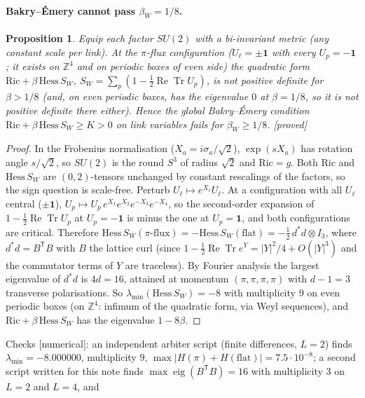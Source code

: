 \documentclass[11pt,a4paper]{article}
\newtheorem{proposition}[theorem]{Proposition}
\theoremstyle{remark}
\theoremstyle{definition}
\newcommand{\Z}{\mathbb{Z}}
\newcommand{\ReTr}{\operatorname{Re}\operatorname{Tr}}
\newcommand{\st}[1]{\textsf{[#1]}}
\begin{document}
\paragraph{Bakry--\'Emery cannot pass $\beta_W=1/8$.}
\begin{proposition}\label{prop:piflux}
Equip each factor $SU(2)$ with a bi-invariant metric (any constant scale per link). At the $\pi$-flux
configuration ($U_\ell=\pm\mathbf 1$ with every $U_p=-\mathbf 1$; it exists on $\Z^4$ and on periodic boxes of
even side) the quadratic form $\mathrm{Ric}+\beta\,\mathrm{Hess}\,S_W$, $S_W=\sum_p(1-\frac12\ReTr U_p)$, is not
positive definite for $\beta>1/8$ (and, on even periodic boxes, has the eigenvalue $0$ at $\beta=1/8$, so it
is not positive definite there either). Hence the global Bakry--\'Emery
condition $\mathrm{Ric}+\beta\,\mathrm{Hess}\,S_W\ge K>0$ on link variables fails for $\beta_W\ge1/8$. \st{proved}
\end{proposition}
\begin{proof}
In the Frobenius normalisation ($X_a=i\sigma_a/\sqrt2$), $\exp(sX_a)$ has rotation angle $s/\sqrt2$, so
$SU(2)$ is the round $S^3$ of radius $\sqrt2$ and $\mathrm{Ric}=g$. Both $\mathrm{Ric}$ and $\mathrm{Hess}\,S_W$ are
$(0,2)$-tensors unchanged by constant rescalings of the factors, so the sign question is scale-free.
Perturb $U_\ell\mapsto e^{X_\ell}U_\ell$. At a configuration with all $U_\ell$ central ($\pm\mathbf 1$),
$U_p\mapsto U_p\,e^{X_1}e^{X_2}e^{-X_3}e^{-X_4}$, so the second-order expansion of $1-\frac12\ReTr U_p$ at
$U_p=-\mathbf 1$ is minus the one at $U_p=\mathbf 1$, and both configurations are critical. Therefore
$\mathrm{Hess}\,S_W(\pi\text{-flux})=-\mathrm{Hess}\,S_W(\text{flat})=-\frac12\,d^*d\otimes I_3$, where $d^*d=B^{\mathsf T}B$
with $B$ the lattice curl (since $1-\frac12\ReTr e^{Y}=|Y|^2/4+O(|Y|^3)$ and the commutator terms of $Y$ are
traceless). By Fourier analysis the largest eigenvalue of $d^*d$ is $4d=16$, attained at momentum
$(\pi,\pi,\pi,\pi)$ with $d-1=3$ transverse polarisations. So $\lambda_{\min}(\mathrm{Hess}\,S_W)=-8$ with
multiplicity $9$ on even periodic boxes (on $\Z^4$: infimum of the quadratic form, via Weyl sequences), and
$\mathrm{Ric}+\beta\,\mathrm{Hess}\,S_W$ has the eigenvalue $1-8\beta$.
\end{proof}
Checks \st{numerical}: an independent arbiter script (finite differences, $L=2$) finds
$\lambda_{\min}=-8.000000$, multiplicity $9$, $\max|H(\pi)+H(\text{flat})|=7.5\cdot10^{-8}$; a second script
written for this note finds $\max\operatorname{eig}(B^{\mathsf T}B)=16$ with multiplicity $3$ on $L=2$ and $L=4$, and
\end{document}
